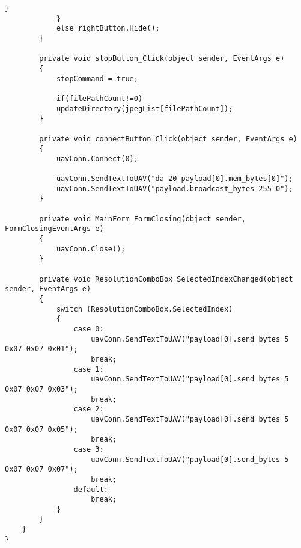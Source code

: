\begin{lstlisting}[caption=Main Form of GUI, label=appen:main_form]
                }
            }
            else rightButton.Hide();
        }

        private void stopButton_Click(object sender, EventArgs e)
        {
            stopCommand = true;

            if(filePathCount!=0)
            updateDirectory(jpegList[filePathCount]);
        }

        private void connectButton_Click(object sender, EventArgs e)
        {
            uavConn.Connect(0);

            uavConn.SendTextToUAV("da 20 payload[0].mem_bytes[0]");
            uavConn.SendTextToUAV("payload.broadcast_bytes 255 0");
        }

        private void MainForm_FormClosing(object sender, FormClosingEventArgs e)
        {
            uavConn.Close();
        }

        private void ResolutionComboBox_SelectedIndexChanged(object sender, EventArgs e)
        {
            switch (ResolutionComboBox.SelectedIndex)
            {
                case 0:
                    uavConn.SendTextToUAV("payload[0].send_bytes 5 0x07 0x07 0x01");
                    break;
                case 1:
                    uavConn.SendTextToUAV("payload[0].send_bytes 5 0x07 0x07 0x03");
                    break;
                case 2:
                    uavConn.SendTextToUAV("payload[0].send_bytes 5 0x07 0x07 0x05");
                    break;
                case 3:
                    uavConn.SendTextToUAV("payload[0].send_bytes 5 0x07 0x07 0x07");
                    break;
                default:
                    break;
            }
        }
    }
}

\end{lstlisting}
